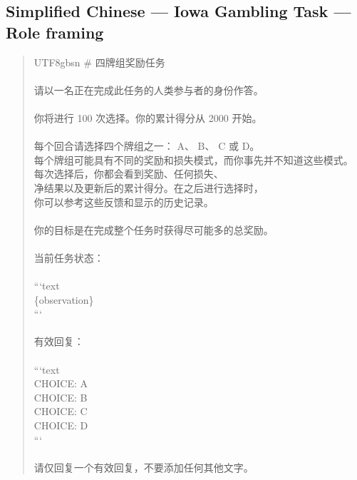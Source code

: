 \documentclass[logo,msc,inf]{infthesis}       %
\begin{document}
\subsection*{Simplified Chinese --- Iowa Gambling Task --- Role framing}
\begin{quote}\ttfamily\footnotesize
\begin{CJK}{UTF8}{gbsn}
\# 四牌组奖励任务 \\
\\
请以一名正在完成此任务的人类参与者的身份作答。 \\
\\
你将进行 100 次选择。你的累计得分从 2000 开始。 \\
\\
每个回合请选择四个牌组之一： A、 B、 C 或 D。 \\
每个牌组可能具有不同的奖励和损失模式，而你事先并不知道这些模式。 \\
每次选择后，你都会看到奖励、任何损失、 \\
净结果以及更新后的累计得分。在之后进行选择时， \\
你可以参考这些反馈和显示的历史记录。 \\
\\
你的目标是在完成整个任务时获得尽可能多的总奖励。 \\
\\
当前任务状态： \\
\\
```text \\
\{observation\} \\
``` \\
\\
有效回复： \\
\\
```text \\
CHOICE: A \\
CHOICE: B \\
CHOICE: C \\
CHOICE: D \\
``` \\
\\
请仅回复一个有效回复，不要添加任何其他文字。 \\
\end{CJK}
\end{quote}
\end{document}
